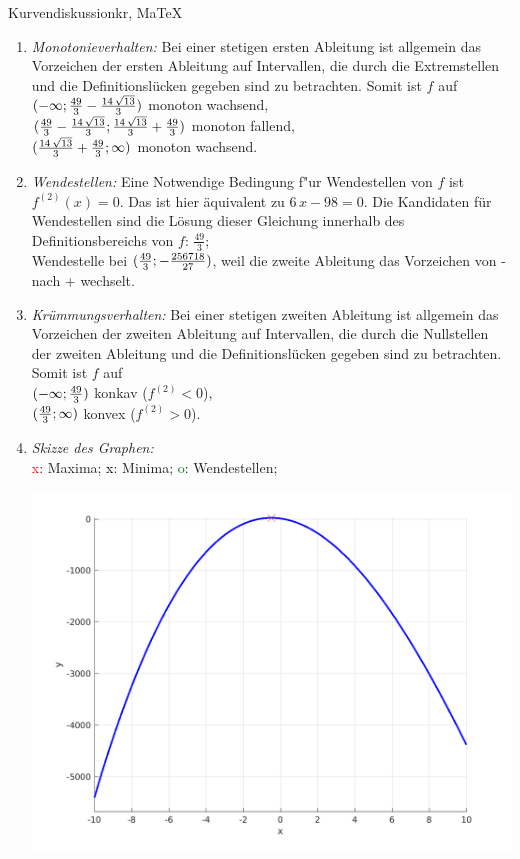 \begin{MAufgabe}{Kurvendiskussion}{kr, MaTeX}
\begin{enumerate}
 \item \emph{Monotonieverhalten:} 
 Bei einer stetigen ersten Ableitung ist allgemein das Vorzeichen der ersten Ableitung auf Intervallen, die durch die Extremstellen und die Definitionsl\"ucken gegeben sind zu betrachten. Somit ist $f$ auf \\ 
 $(-\infty;\frac{49}{3} - \frac{14\, \sqrt{13}}{3})$ monoton wachsend, \\ 
 $(\frac{49}{3} - \frac{14\, \sqrt{13}}{3};\frac{14\, \sqrt{13}}{3} + \frac{49}{3})$ monoton  fallend, \\ 
 $(\frac{14\, \sqrt{13}}{3} + \frac{49}{3}; \infty)$ monoton wachsend. \\ 
 \item \emph{Wendestellen:} 
 Eine Notwendige Bedingung f"ur Wendestellen von $f$ ist $f^{(2)}(x)=0$. 
 Das ist hier \"aquivalent zu $6\, x - 98=0$. 
 Die Kandidaten f\"ur Wendestellen sind die L\"osung dieser Gleichung innerhalb des Definitionsbereichs von $f$: $\frac{49}{3}$; \\ 
 Wendestelle bei $(\frac{49}{3};- \frac{256718}{27})$, weil die zweite Ableitung das Vorzeichen von - nach + wechselt. \\ 
 \item \emph{Kr\"ummungsverhalten:} 
 Bei einer stetigen zweiten Ableitung ist allgemein das Vorzeichen der zweiten Ableitung auf Intervallen, die durch die Nullstellen der zweiten Ableitung und die Definitionsl\"ucken gegeben sind zu betrachten. 
 Somit ist $f$ auf \\ 
 $(-\infty ;\frac{49}{3})$  konkav ($f^{(2)}<0$), \\ 
 $(\frac{49}{3}; \infty)$  konvex ($f^{(2)}>0$). \\ 
 \item \emph{Skizze des Graphen:} \\ 
 {\textcolor{red} x}: Maxima; {\textcolor{black} x}: Minima; {\textcolor{green} o}: Wendestellen; 
  \begin{center}
  \includegraphics[width=0.8\linewidth]{Abb_zur_Ag_autogenerated_fractions_23.png} \end{center}
  
 \end{enumerate}
 \else\relax\fi
  \end{MAufgabe}